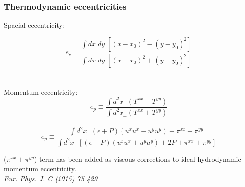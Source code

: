 \documentclass[aspectratio=1610]{beamer}
\begin{document}







\begin{frame}
\frametitle{Thermodynamic eccentricities}

{ \Large Spacial eccentricity:}

\begin{equation}
e_c =  \frac{\int dx \; dy\;[ ( x-x_0 )^2 - (y-y_0)^2 ] }{\int dx \; dy\; [ ( x-x_0 )^2 + (y-y_0)^2 ]}
\end{equation}\\~\\



{ \Large Momentum eccentricity:}
\begin{equation}
e_p\equiv  \frac{\int d^2x_\perp ( T^{xx}-T^{yy} )}{\int d^2x_\perp ( T^{xx}+T^{yy} )}
\end{equation}\\
\begin{equation}
e_p \equiv \frac{\int d^2x_\perp (\epsilon+P) \left(u^x u^x-u^y u^y\right) + \pi^{xx} + \pi^{yy}}{\int d^2x_\perp [ (\epsilon+P) \left(u^x u^x+u^y u^y\right)+2P + \pi^{xx} + \pi^{yy}]}
\end{equation}

($\pi^{xx} + \pi^{yy}$) term has been added as viscous corrections to ideal hydrodynamic momentum eccentricity.\\
\textit{Eur. Phys. J. C (2015) 75 429}
\end{frame}



\end{document}
